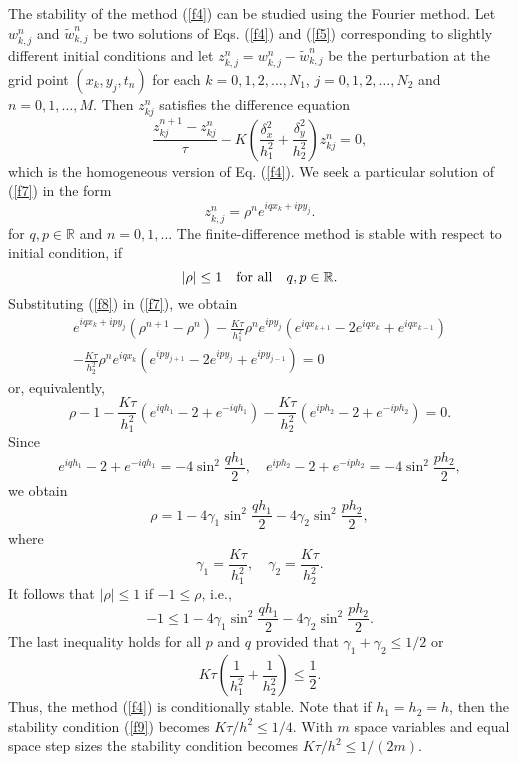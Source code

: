 \vskip 0.3cm  
The stability of the method (\ref{f4}) can be studied using the Fourier method.
Let $w^{n}_{k,j}$ and $\tilde{w}^{n}_{k,j}$ be two solutions of Eqs. (\ref{f4})
and (\ref{f5}) corresponding to slightly different initial conditions and
let $z^{n}_{k,j}=w^{n}_{k,j}-\tilde{w}^{n}_{k,j}$ be
the perturbation at the grid point $(x_{k}, y_{j}, t_{n})$ for each
$k=0,1,2, \dots, N_{1}$,
$j=0,1,2, \dots, N_{2}$ and $n=0,1, \dots,M$.
Then $z^{n}_{kj}$ satisfies the difference equation
\begin{equation}
\frac{z_{kj}^{n+1}-z_{kj}^{n}}{\tau} -K\left(\frac{\delta_{x}^2}{h_{1}^2}
+\frac{\delta_{y}^2}{h_{2}^2}\right)z_{kj}^{n}=0, \label{f7}
\end{equation}
which is the homogeneous version of Eq. (\ref{f4}).
We seek a particular solution of
(\ref{f7}) in the form
\begin{equation}
z^{n}_{k,j}=\rho^{n}e^{iqx_{k}+ipy_{j}}. \label{f8}
\end{equation}
for $q,p\in{\mathbb R}$ and $n=0,1,\dots$
The finite-difference method is stable with respect to
initial condition, if
\[
\vert\rho\vert\leq 1 \quad {\rm for \ all } \quad q,p\in{\mathbb R}.
\]
Substituting (\ref{f8}) in (\ref{f7}), we obtain
\begin{multline*}
e^{iqx_{k}+ipy_{j}}\left(\rho^{n+1}-\rho^{n}\right) -
\frac{K\tau}{h_{1}^2}\rho^{n}e^{ipy_{j}}
\left(e^{iqx_{k+1}}-2e^{iqx_{k}}+e^{iqx_{k-1}}\right)\\
-\frac{K\tau}{h_{2}^2}\rho^{n}e^{iqx_{k}}
\left(e^{ipy_{j+1}}-2e^{ipy_{j}}+e^{ipy_{j-1}}\right)=0
\end{multline*}
or, equivalently,
\[
\rho-1-\frac{K\tau}{h_{1}^2}
\left(e^{iqh_{1}}-2+e^{-iqh_{1}}\right)-
\frac{K\tau}{h_{2}^2}\left(e^{iph_{2}}-2+e^{-iph_{2}}\right)=0.
\]
Since
\[
e^{iqh_{1}}-2+e^{-iqh_{1}}=-4\sin^{2} \frac{qh_{1}}{2}, \quad
e^{iph_{2}}-2+e^{-iph_{2}}=-4\sin^{2} \frac{ph_{2}}{2},
\]
we obtain
\[
\rho=1-4\gamma_{1}\sin^{2} \frac{qh_{1}}{2}
-4\gamma_{2}\sin^{2} \frac{ph_{2}}{2},
\]
where
\[
\gamma_{1}=\frac{K\tau}{h_{1}^2}, \quad
\gamma_{2}=\frac{K\tau}{h_{2}^2}.
\]
It follows that $\vert\rho\vert\leq 1$ if $-1\leq\rho$, i.e.,
\[
-1\leq 1-4\gamma_{1}\sin^{2} \frac{qh_{1}}{2}
-4\gamma_{2}\sin^{2} \frac{ph_{2}}{2}.
\]
The last inequality holds for all $p$ and $q$ provided that $\gamma_{1}+\gamma_{2}\leq 1/2$
or
\begin{equation}
K\tau
\left(\frac{1}{h_{1}^2}+\frac{1}{h_{2}^2}\right)\leq\frac{1}{2}. \label{f9}
\end{equation}
Thus, the method (\ref{f4}) is conditionally stable. Note that if
$h_{1}=h_{2}=h$, then the stability condition (\ref{f9}) becomes
$K\tau/h^2\leq 1/4$. With $m$ space variables and equal space step
sizes the stability condition becomes $K\tau/h^2\leq 1/(2m)$.


